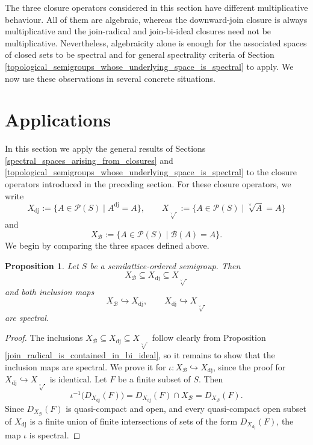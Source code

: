 \documentclass[10pt, reqno]{amsart}
\theoremstyle{plain}
\newtheorem{prop}[theorem]{Proposition}
\theoremstyle{definition}
\begin{document}
The three closure operators considered in this section have different multiplicative behaviour. All of them are algebraic, whereas the downward-join closure is always multiplicative and the join-radical and join-bi-ideal closures need not be multiplicative. Nevertheless, algebraicity alone is enough for the associated spaces of closed sets to be spectral and for general spectrality criteria of Section \ref{topological_semigroups_whose_underlying_space_is_spectral} to apply. We now use these observations in several concrete situations. 
\section{Applications}\label{applications}
In this section we apply the general results of Sections \ref{spectral_spaces_arising_from_closures} and \ref{topological_semigroups_whose_underlying_space_is_spectral} to the closure operators introduced in the preceding section. For these closure operators, we write $$X_\mathrm{dj} := \{A \in \mathcal{P}(S) \mid A^\mathrm{dj} = A\}, \qquad X_{\sqrt[\lor]{\ }} := \{A \in \mathcal{P}(S) \mid \sqrt[\lor]{A} = A\}$$ and $$X_{\mathcal{B}} := \{A \in\mathcal{P}(S) \mid \mathcal{B}(A) = A\}.$$ We begin by comparing the three spaces defined above.
\begin{prop}
    Let $S$ be a semilattice-ordered semigroup. Then $$X_\mathcal{B} \subseteq X_\mathrm{dj} \subseteq X_{\sqrt[\lor]{\ }}$$ and both inclusion maps $$X_\mathcal{B} \hookrightarrow X_\mathrm{dj}, \qquad X_\mathrm{dj} \hookrightarrow X_{\sqrt[\lor]{\ }}$$ are spectral.
\end{prop}
\begin{proof}
    The inclusions $X_\mathcal{B} \subseteq X_\mathrm{dj} \subseteq X_{\sqrt[\lor]{\ }}$ follow clearly from Proposition \ref{join_radical_is_contained_in_bi_ideal}, so it remains to show that the inclusion maps are spectral. We prove it for $\iota : X_\mathcal{B} \hookrightarrow X_\mathrm{dj}$, since the proof for $X_\mathrm{dj} \hookrightarrow X_{\sqrt[\lor]{\ }}$ is identical. Let $F$ be a finite subset of $S$. Then $$\iota^{-1}\big(D_{X_\mathrm{dj}}(F)\big) = D_{X_\mathrm{dj}}(F) \cap X_\mathcal{B} = D_{X_\mathcal{B}}(F).$$ Since $D_{X_\mathcal{B}}(F)$ is quasi-compact and open, and every quasi-compact open subset of $X_\mathrm{dj}$ is a finite union of finite intersections of sets of the form $D_{X_\mathrm{dj}}(F)$, the map $\iota$ is spectral. 
\end{proof}
\end{document}
